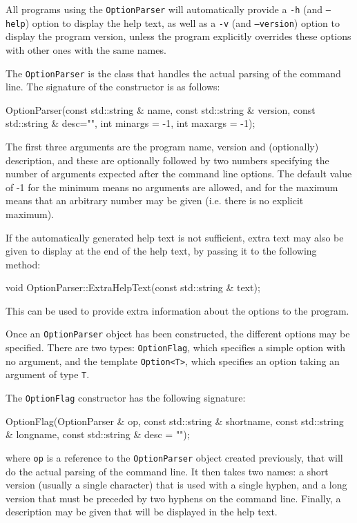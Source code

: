 All programs using the \texttt{OptionParser} will automatically provide a
\texttt{-h} (and \texttt{--help}) option to display the help text,
as well as a \texttt{-v} (and \texttt{--version}) option to display the program version,
unless the program explicitly overrides these options with other ones with the same names.

The \texttt{OptionParser} is the class that handles the actual parsing of the command line.
The signature of the constructor is as follows:
\begin{listing}
OptionParser(const std::string & name, const std::string & version,
             const std::string & desc="", int minargs = -1, int maxargs = -1);
\end{listing}
The first three arguments are the program name, version and (optionally) description,
and these are optionally followed by two numbers specifying the number of arguments
expected after the command line options.
The default value of -1 for the minimum means no arguments are allowed,
and for the maximum means that an arbitrary number may be given
(i.e. there is no explicit maximum).

If the automatically generated help text is not sufficient,
extra text may also be given to display at the end of the help text,
by passing it to the following method:
\begin{listing}
void OptionParser::ExtraHelpText(const std::string & text);
\end{listing}
This can be used to provide extra information about the options to the program.

Once an \texttt{OptionParser} object has been constructed, the different options may be specified.
There are two types: \texttt{OptionFlag}, which specifies a simple option with no argument,
and the template \texttt{Option<T>}, which specifies an option taking an argument of type \texttt{T}.

The \texttt{OptionFlag} constructor has the following signature:
\begin{listing}
OptionFlag(OptionParser & op, const std::string & shortname,
           const std::string & longname, const std::string & desc = "");
\end{listing}
where \texttt{op} is a reference to the \texttt{OptionParser} object created previously,
that will do the actual parsing of the command line.
It then takes two names: a short version (usually a single character) that is used with a single hyphen,
and a long version that must be preceded by two hyphens on the command line.
Finally, a description may be given that will be displayed in the help text.

